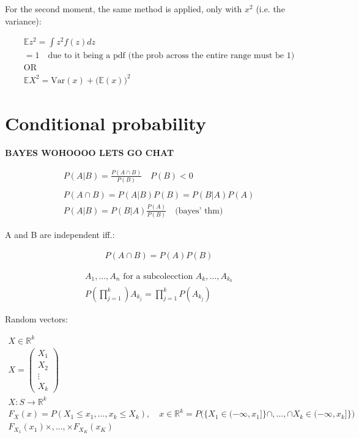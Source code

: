 \documentclass[10pt]{article}
\begin{document}
\newpage

For the second moment, the same method is applied, only with $x^2$ (i.e. the variance):

\begin{align*}
    \mathbb{E}z^2 = \int z^2 f(z) dz \\ 
    = 1 \quad\text{due to it being a pdf (the prob across the entire range must be 1)}\\ 
    \text{OR} \\
    \mathbb{E}X^2 = \text{Var}(x) + \big(\mathbb{E}(x)\big)^2
\end{align*}

\section{Conditional probability}

\textbf{BAYES WOHOOOO LETS GO CHAT}

\begin{align*}
    P(A | B) = \frac{P(A\cap B)}{P(B)} \quad P(B) < 0 \\
    \\ 
    P(A\cap B) = P(A | B)P(B) = P(B | A)P(A) \\
    P(A | B) = P(B | A)\frac{P(A)}{P(B)} \quad\text{(bayes' thm)}
\end{align*}

\hfill 

A and B are independent iff.:

\begin{align*}
    P(A\cap B) = P(A)P(B)
\end{align*}

\begin{align*}
    A_1, …, A_n \text{ for a subcolecction } A_k, …, A_{k_k} \\ 
    P(\prod_{j = 1}^{k})A_{k_j} = \prod_{j = 1}^{k}P(A_{k_j})
\end{align*}

\hfill 

Random vectors:

\begin{align*}
    X \in \mathbb{R}^k\\
    X = 
    \begin{pmatrix}
        X_1 \\
        X_2 \\
        \vdots \\
        X_k
    \end{pmatrix} \\ 
    X: S \to \mathbb{R}^k \\ 
    F_X(x) = P(X_1 \leq x_1, …, x_k \leq X_k), \quad x \in \mathbb{R}^k = P\big(\{X_1 \in (-\infty, x_1]\} \cap, …, \cap X_k \in (-\infty, x_k]\}\big) \\
    F_{X_1}(x_1) \times, …, \times F_{X_K}(x_K)
\end{align*}
\end{document}
